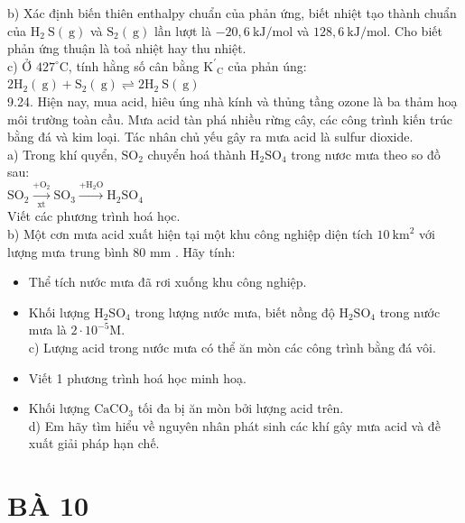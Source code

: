 \documentclass[10pt]{article}
\begin{document}
b) Xác định biến thiên enthalpy chuẩn của phản ứng, biết nhiệt tạo thành chuẩn của $\mathrm{H}_{2} \mathrm{~S}(\mathrm{~g})$ và $\mathrm{S}_{2}(\mathrm{~g})$ lần lượt là $-20,6 \mathrm{~kJ} / \mathrm{mol}$ và $128,6 \mathrm{~kJ} / \mathrm{mol}$. Cho biết phản ứng thuận là toả nhiệt hay thu nhiệt.\\
c) Ở $427^{\circ} \mathrm{C}$, tính hằng số cân bằng $\mathrm{K}^{\prime}{ }_{\mathrm{C}}$ của phản úng:\\
$2 \mathrm{H}_{2}(\mathrm{~g})+\mathrm{S}_{2}(\mathrm{~g}) \rightleftharpoons 2 \mathrm{H}_{2} \mathrm{~S}(\mathrm{~g})$\\
9.24. Hiện nay, mua acid, hiêu úng nhà kính và thủng tầng ozone là ba thảm hoạ môi trường toàn cầu. Mưa acid tàn phá nhiều rừng cây, các công trình kiến trúc bằng đá và kim loại. Tác nhân chủ yếu gây ra mưa acid là sulfur dioxide.\\
a) Trong khí quyển, $\mathrm{SO}_{2}$ chuyển hoá thành $\mathrm{H}_{2} \mathrm{SO}_{4}$ trong nươc mưa theo so đồ sau:\\
$\mathrm{SO}_{2} \xrightarrow[\mathrm{xt}]{+\mathrm{O}_{2}} \mathrm{SO}_{3} \xrightarrow{+\mathrm{H}_{2} \mathrm{O}} \mathrm{H}_{2} \mathrm{SO}_{4}$\\
Viết các phương trình hoá học.\\
b) Một cơn mưa acid xuất hiện tại một khu công nghiệp diện tích $10 \mathrm{~km}^{2}$ với lượng mưa trung bình 80 mm . Hãy tính:

\begin{itemize}
  \item Thể tích nước mưa đã rơi xuống khu công nghiệp.
  \item Khối lượng $\mathrm{H}_{2} \mathrm{SO}_{4}$ trong lượng nước mưa, biết nồng độ $\mathrm{H}_{2} \mathrm{SO}_{4}$ trong nước mưa là $2 \cdot 10^{-5} \mathrm{M}$.\\
c) Lượng acid trong nước mưa có thể ăn mòn các công trình bằng đá vôi.
  \item Viết 1 phương trình hoá học minh hoạ.
  \item Khối lượng $\mathrm{CaCO}_{3}$ tối đa bị ăn mòn bởi lượng acid trên.\\
d) Em hãy tìm hiểu về nguyên nhân phát sinh các khí gây mưa acid và đề xuất giải pháp hạn chế.
\end{itemize}

\section*{BÀ 10}
\end{document}
